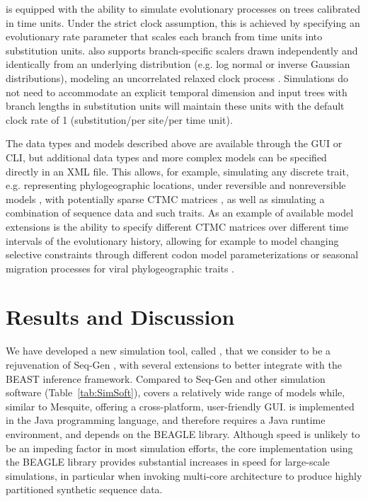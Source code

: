 {\bussname} is equipped with the ability to simulate evolutionary processes on trees calibrated in time units. 
Under the strict clock assumption, this is achieved by specifying an evolutionary rate parameter that scales each branch from time units into substitution units.
{\bussname} also supports branch-specific scalers drawn independently and identically from an underlying distribution (e.g. log normal or inverse Gaussian distributions), modeling an uncorrelated relaxed clock process \cite{Drummond2006}.
Simulations do not need to accommodate an explicit temporal dimension and input trees with branch lengths in substitution units will maintain these units with the default clock rate of 1 (substitution/per site/per time unit).

The data types and models described above are available through the {\bussname} GUI or CLI, but additional data types and more complex models can be specified directly in an XML file.
This allows, for example, simulating any discrete trait, e.g. representing phylogeographic locations, under reversible and nonreversible models \cite{Lemey2009,Edwards2011}, with potentially sparse CTMC matrices \cite{Lemey2009}, as well as simulating a combination of sequence data and such traits.
As an example of available model extensions is the ability to specify different CTMC matrices over different time intervals of the evolutionary history, allowing for example to model changing selective constraints through different codon model parameterizations or seasonal migration processes for viral phylogeographic traits \citep{Bielejec2014a}.

\section{Results and Discussion}

We have developed a new simulation tool, called {\bussname}, that we consider to be a rejuvenation of Seq-Gen \citep{Rambaut1997}, with several extensions to better integrate with the BEAST inference framework.
Compared to Seq-Gen and other simulation software (Table~\ref{tab:SimSoft}), {\bussname} covers a relatively wide range of models while, similar to Mesquite, offering a cross-platform, user-friendly GUI.
{\bussname} is implemented in the Java programming language, and therefore requires a Java runtime environment, and depends on the BEAGLE library.
Although speed is unlikely to be an impeding factor in most simulation efforts, the core implementation using the BEAGLE library provides substantial increases in speed for large-scale simulations, in particular when invoking multi-core architecture to produce highly partitioned synthetic sequence data.

